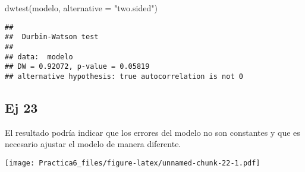 \documentclass[
]{article}
\newenvironment{Shaded}{\begin{snugshade}}{\end{snugshade}}
\newcommand{\AttributeTok}[1]{\textcolor[rgb]{0.77,0.63,0.00}{#1}}
\newcommand{\DecValTok}[1]{\textcolor[rgb]{0.00,0.00,0.81}{#1}}
\newcommand{\FunctionTok}[1]{\textcolor[rgb]{0.00,0.00,0.00}{#1}}
\newcommand{\NormalTok}[1]{#1}
\newcommand{\SpecialCharTok}[1]{\textcolor[rgb]{0.00,0.00,0.00}{#1}}
\newcommand{\StringTok}[1]{\textcolor[rgb]{0.31,0.60,0.02}{#1}}
\begin{document}
\begin{Shaded}
\begin{Highlighting}[]
\FunctionTok{dwtest}\NormalTok{(modelo, }\AttributeTok{alternative =} \StringTok{"two.sided"}\NormalTok{)}
\end{Highlighting}
\end{Shaded}

\begin{verbatim}
## 
##  Durbin-Watson test
## 
## data:  modelo
## DW = 0.92072, p-value = 0.05819
## alternative hypothesis: true autocorrelation is not 0
\end{verbatim}

\hypertarget{ej-23}{%
\subsection{Ej 23}\label{ej-23}}

El resultado podría indicar que los errores del modelo no son constantes
y que es necesario ajustar el modelo de manera diferente.

\begin{Shaded}
\end{Shaded}

\texttt{[image: Practica6\_files/figure-latex/unnamed-chunk-22-1.pdf]}
\end{document}
